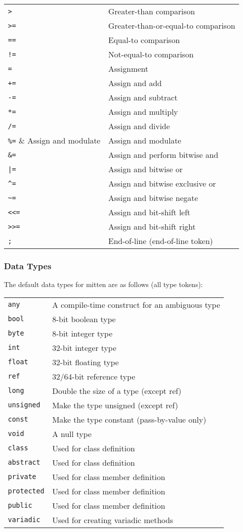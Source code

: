 \documentclass[10pt,a4paper]{article}
\begin{document}
\begin{tabular}{l l}
\verb|>| & Greater-than comparison \\
\verb|>=| & Greater-than-or-equal-to comparison \\
\verb|==| & Equal-to comparison \\
\verb|!=| & Not-equal-to comparison \\
\verb|=| & Assignment \\
\verb|+=| & Assign and add \\
\verb|-=| & Assign and subtract \\
\verb|*=| & Assign and multiply \\
\verb|/=| & Assign and divide \\
\verb|%=| & Assign and modulate \\
\verb|&=| & Assign and perform bitwise and \\
\verb/|=/ & Assign and bitwise or \\
\verb|^=| & Assign and bitwise exclusive or \\
\verb|~=| & Assign and bitwise negate \\
\verb|<<=| & Assign and bit-shift left \\
\verb|>>=| & Assign and bit-shift right \\
\verb|;| & End-of-line (end-of-line token) \\
\end{tabular}

\subsubsection{Data Types}
The default data types for mitten are as follows (all type tokens):

\begin{tabular}{l l}
\verb|any| & A compile-time construct for an ambiguous type \\
\verb|bool| & 8-bit boolean type \\
\verb|byte| & 8-bit integer type \\
\verb|int| & 32-bit integer type \\
\verb|float| & 32-bit floating type \\
\verb|ref| & 32/64-bit reference type \\
\verb|long| & Double the size of a type (except ref) \\
\verb|unsigned| & Make the type unsigned (except ref) \\
\verb|const| & Make the type constant (pass-by-value only) \\
\verb|void| & A null type \\
\verb|class| & Used for class definition \\
\verb|abstract| & Used for class definition \\
\verb|private| & Used for class member definition \\
\verb|protected| & Used for class member definition \\
\verb|public| & Used for class member definition \\
\verb|variadic| & Used for creating variadic methods \\
\end{tabular}
\end{document}
